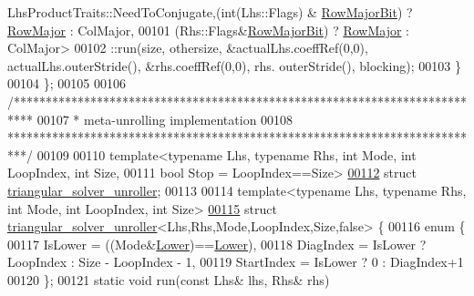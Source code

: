 \begin{DoxyCode}
      LhsProductTraits::NeedToConjugate,(int(Lhs::Flags) & \hyperlink{group__flags_gae4f56c2a60bbe4bd2e44c5b19cbe8762}{RowMajorBit}) ? \hyperlink{group__enums_ggaacded1a18ae58b0f554751f6cdf9eb13acfcde9cd8677c5f7caf6bd603666aae3}{RowMajor} : ColMajor,
00101                                (Rhs::Flags&\hyperlink{group__flags_gae4f56c2a60bbe4bd2e44c5b19cbe8762}{RowMajorBit}) ? \hyperlink{group__enums_ggaacded1a18ae58b0f554751f6cdf9eb13acfcde9cd8677c5f7caf6bd603666aae3}{RowMajor} : ColMajor>
00102       ::run(size, othersize, &actualLhs.coeffRef(0,0), actualLhs.outerStride(), &rhs.coeffRef(0,0), rhs.
      outerStride(), blocking);
00103   \}
00104 \};
00105 
00106 \textcolor{comment}{/***************************************************************************}
00107 \textcolor{comment}{* meta-unrolling implementation}
00108 \textcolor{comment}{***************************************************************************/}
00109 
00110 \textcolor{keyword}{template}<\textcolor{keyword}{typename} Lhs, \textcolor{keyword}{typename} Rhs, \textcolor{keywordtype}{int} Mode, \textcolor{keywordtype}{int} LoopIndex, \textcolor{keywordtype}{int} Size,
00111          \textcolor{keywordtype}{bool} Stop = LoopIndex==Size>
\hyperlink{struct_eigen_1_1internal_1_1triangular__solver__unroller}{00112} \textcolor{keyword}{struct }\hyperlink{struct_eigen_1_1internal_1_1triangular__solver__unroller}{triangular\_solver\_unroller};
00113 
00114 \textcolor{keyword}{template}<\textcolor{keyword}{typename} Lhs, \textcolor{keyword}{typename} Rhs, \textcolor{keywordtype}{int} Mode, \textcolor{keywordtype}{int} LoopIndex, \textcolor{keywordtype}{int} Size>
\hyperlink{struct_eigen_1_1internal_1_1triangular__solver__unroller_3_01_lhs_00_01_rhs_00_01_mode_00_01_looefec01585c67928d42a9958d8c8f161e}{00115} \textcolor{keyword}{struct }\hyperlink{struct_eigen_1_1internal_1_1triangular__solver__unroller}{triangular\_solver\_unroller}<Lhs,Rhs,Mode,LoopIndex,Size,false> \{
00116   \textcolor{keyword}{enum} \{
00117     IsLower = ((Mode&\hyperlink{group__enums_gga39e3366ff5554d731e7dc8bb642f83cda891792b8ed394f7607ab16dd716f60e6}{Lower})==\hyperlink{group__enums_gga39e3366ff5554d731e7dc8bb642f83cda891792b8ed394f7607ab16dd716f60e6}{Lower}),
00118     DiagIndex  = IsLower ? LoopIndex : Size - LoopIndex - 1,
00119     StartIndex = IsLower ? 0         : DiagIndex+1
00120   \};
00121   \textcolor{keyword}{static} \textcolor{keywordtype}{void} run(\textcolor{keyword}{const} Lhs& lhs, Rhs& rhs)

\end{DoxyCode}
